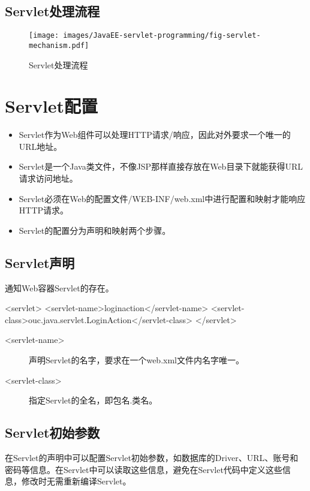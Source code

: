 \subsection{Servlet处理流程} 

\begin{figure}[htb]
\centering
\texttt{[image: images/JavaEE-servlet-programming/fig-servlet-mechanism.pdf]}
\caption{Servlet处理流程}
\label{fig:servlet-mechanism}
\end{figure}


\section{Servlet配置}

\begin{itemize}
\item Servlet作为Web组件可以处理HTTP请求/响应，因此对外要求一个唯一的URL地址。
\item Servlet是一个Java类文件，不像JSP那样直接存放在Web目录下就能获得URL请求访问地址。
\item Servlet必须在Web的配置文件{\Red /WEB-INF/web.xml}中进行配置和映射才能响应HTTP请求。
\item Servlet的配置分为{\hei 声明和映射}两个步骤。
\end{itemize}

\subsection{Servlet声明}

通知Web容器Servlet的存在。

\begin{xmlCode}
  <servlet>
    <servlet-name>loginaction</servlet-name>
    <servlet-class>ouc.java.servlet.LoginAction</servlet-class>
  </servlet>  
\end{xmlCode}

\begin{description}
\item[<servlet-name>] 声明Servlet的名字，要求在一个web.xml文件内名字唯一。
\item[<servlet-class>] 指定Servlet的全名，即包名.类名。
\end{description}

\subsection{Servlet初始参数}

在Servlet的声明中可以配置Servlet初始参数，如数据库的Driver、URL、账号和
密码等信息。在Servlet中可以读取这些信息，避免在Servlet代码中定义这些信
息，修改时无需重新编译Servlet。

